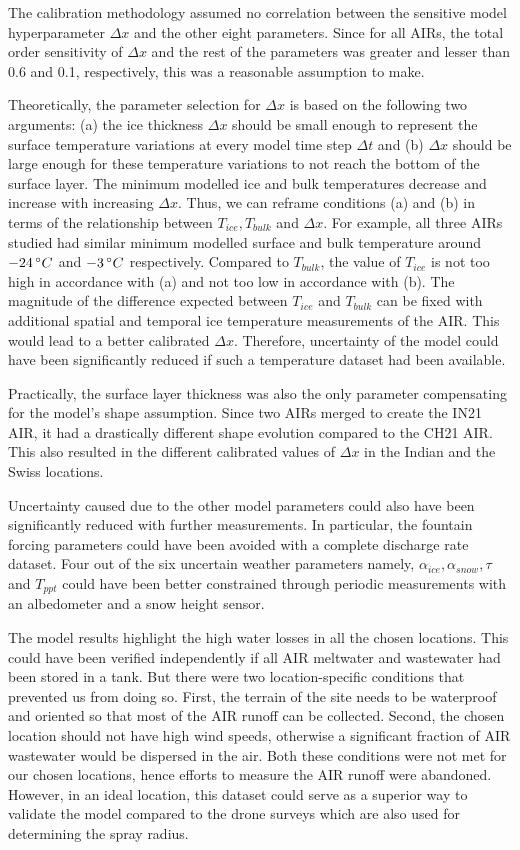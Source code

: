 \documentclass[utf8]{frontiersSCNS}
\begin{document}
The calibration methodology assumed no correlation between the sensitive model hyperparameter $\Delta x$ and the
other eight parameters. Since for all AIRs, the total order sensitivity of $\Delta x$ and the rest of the
parameters was greater and lesser than 0.6 and 0.1, respectively, this was a reasonable assumption to make.

Theoretically, the parameter selection for $\Delta x$ is based on the following two arguments: (a) the ice
thickness $\Delta x$ should be small enough to represent the surface temperature variations at every model time
step $\Delta t$ and (b) $\Delta x$ should be large enough for these temperature variations to not reach the
bottom of the surface layer. The minimum modelled ice and bulk temperatures decrease and increase with
increasing $\Delta x$. Thus, we can reframe conditions (a) and (b) in terms of the relationship between
$T_{ice}, T_{bulk}$ and $\Delta x$. For example, all three AIRs studied had similar minimum modelled
surface and bulk temperature around $-24\,\degree C$ and $-3\,\degree C$ respectively. Compared to $T_{bulk}$,
the value of $T_{ice}$ is not too high in accordance with (a) and not too low in accordance with (b). The
magnitude of the difference expected between $T_{ice}$ and $T_{bulk}$ can be fixed with additional spatial and
temporal ice temperature measurements of the AIR. This would lead to a better calibrated $\Delta x$. Therefore,
uncertainty of the model could have been significantly reduced if such a temperature dataset had been available. 

Practically, the surface layer thickness was also the only parameter compensating for the model's shape
assumption. Since two AIRs merged to create the IN21 AIR, it had a drastically different shape evolution
compared to the CH21 AIR. This also resulted in the different calibrated values of $\Delta x$ in the Indian
and the Swiss locations.

Uncertainty caused due to the other model parameters could also have been significantly reduced with further
measurements. In particular, the fountain forcing parameters could have been avoided with a complete discharge
rate dataset. Four out of the six uncertain weather parameters namely, $\alpha_{ice}, \alpha_{snow}, \tau$ and
$T_{ppt}$ could have been better constrained through periodic measurements with an albedometer and a snow height
sensor. 

The model results highlight the high water losses in all the chosen locations. This could have been verified
independently if all AIR meltwater and wastewater had been stored in a tank. But there were two
location-specific conditions that prevented us from doing so. First, the terrain of the site needs to be
waterproof and oriented so that most of the AIR runoff can be collected. Second, the chosen location should not
have high wind speeds, otherwise a significant fraction of AIR wastewater would be dispersed in the air. Both
these conditions were not met for our chosen locations, hence efforts to measure the AIR runoff were abandoned.
However, in an ideal location, this dataset could serve as a superior way to validate the model compared to the
drone surveys which are also used for determining the spray radius.
\end{document}
